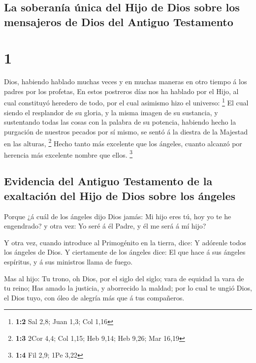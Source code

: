 \hypertarget{la-soberanuxeda-uxfanica-del-hijo-de-dios-sobre-los-mensajeros-de-dios-del-antiguo-testamento}{%
\subsection{La soberanía única del Hijo de Dios sobre los mensajeros de
Dios del Antiguo
Testamento}\label{la-soberanuxeda-uxfanica-del-hijo-de-dios-sobre-los-mensajeros-de-dios-del-antiguo-testamento}}

\hypertarget{section}{%
\section{1}\label{section}}

 Dios, habiendo hablado muchas veces y en muchas maneras en
otro tiempo á los padres por los profetas,  En estos
postreros días nos ha hablado por el Hijo, al cual constituyó heredero
de todo, por el cual asimismo hizo el universo: \footnote{\textbf{1:2}
  Sal 2,8; Juan 1,3; Col 1,16}  El cual siendo el resplandor
de su gloria, y la misma imagen de su sustancia, y sustentando todas las
cosas con la palabra de su potencia, habiendo hecho la purgación de
nuestros pecados por sí mismo, se sentó á la diestra de la Majestad en
las alturas, \footnote{\textbf{1:3} 2Cor 4,4; Col 1,15; Heb 9,14; Heb
  9,26; Mar 16,19}  Hecho tanto más excelente que los
ángeles, cuanto alcanzó por herencia más excelente nombre que ellos.
\footnote{\textbf{1:4} Fil 2,9; 1Pe 3,22}

\hypertarget{evidencia-del-antiguo-testamento-de-la-exaltaciuxf3n-del-hijo-de-dios-sobre-los-uxe1ngeles}{%
\subsection{Evidencia del Antiguo Testamento de la exaltación del Hijo
de Dios sobre los
ángeles}\label{evidencia-del-antiguo-testamento-de-la-exaltaciuxf3n-del-hijo-de-dios-sobre-los-uxe1ngeles}}

 Porque ¿á cuál de los ángeles dijo Dios jamás: Mi hijo eres
tú, hoy yo te he engendrado? y otra vez: Yo seré á él Padre, y él me
será á mí hijo?

 Y otra vez, cuando introduce al Primogénito en la tierra,
dice: Y adórenle todos los ángeles de Dios.  Y ciertamente
de los ángeles dice: El que hace á sus ángeles espíritus, y á sus
ministros llama de fuego.

 Mas al hijo: Tu trono, oh Dios, por el siglo del siglo;
vara de equidad la vara de tu reino;  Has amado la justicia,
y aborrecido la maldad; por lo cual te ungió Dios, el Dios tuyo, con
óleo de alegría más que á tus compañeros.

